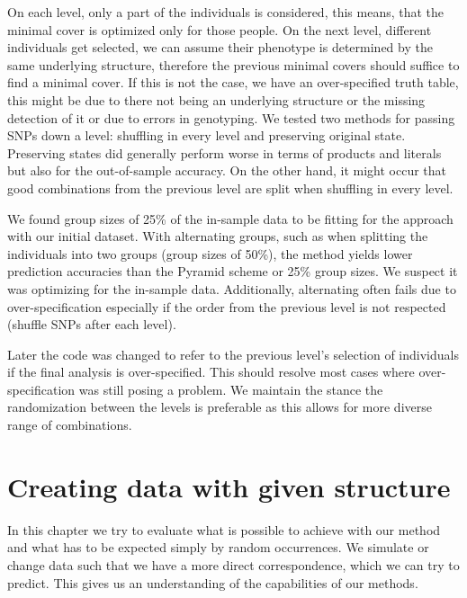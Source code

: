 \documentclass[letterpaper, 11pt]{article}
\begin{document}
On each level, only a part of the individuals is considered, this means, that the minimal cover is optimized only for those people. On the next level, different individuals get selected, we can assume their phenotype is determined by the same underlying structure, therefore the previous minimal covers should suffice to find a minimal cover. If this is not the case, we have an over-specified truth table, this might be due to there not being an underlying structure or the missing detection of it or due to errors in genotyping. 
We tested two methods for passing SNPs down a level: shuffling in every level and preserving original state. Preserving states did generally perform worse in terms of products and literals but also for the out-of-sample accuracy. On the other hand, it might occur that good combinations from the previous level are split when shuffling in every level.

We found group sizes of 25\% of the in-sample data to be fitting for the approach with our initial dataset. With alternating groups, such as when splitting the individuals into two groups (group sizes of 50\%), the method yields lower prediction accuracies than the Pyramid scheme or 25\% group sizes. We suspect it  was optimizing for the in-sample data. Additionally, alternating often fails due to over-specification especially if the order from the previous level is not respected (shuffle SNPs after each level).

Later the code was changed to refer to the previous level's selection of individuals if the final analysis is over-specified. This should resolve most cases where over-specification was still posing a problem. We maintain the stance the randomization between the levels is preferable as this allows for more diverse range of combinations.

\section{Creating data with given structure}
In this chapter we try to evaluate what is possible to achieve with our method and what has to be expected simply by random occurrences. We simulate or change data such that we have a more direct correspondence, which we can try to predict. This gives us an understanding of the capabilities of our methods.
\end{document}
